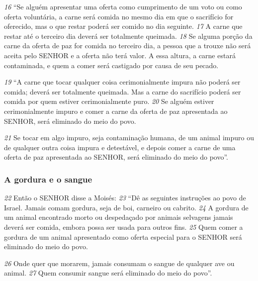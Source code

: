 \smallskip
\textit{\tiny 16}
“Se alguém apresentar uma oferta como cumprimento de um voto ou como
oferta voluntária, a carne será comida no mesmo dia em que o sacrifício for
oferecido, mas o que restar poderá ser comido no dia seguinte. 
\textit{\tiny 17}
A carne que
restar até o terceiro dia deverá ser totalmente queimada. 
\textit{\tiny 18}
Se alguma porção da
carne da oferta de paz for comida no terceiro dia, a pessoa que a trouxe não será
aceita pelo SENHOR e a oferta não terá valor. A essa altura, a carne estará
contaminada, e quem a comer será castigado por causa de seu pecado.
   
\smallskip
\textit{\tiny 19}
“A carne que tocar qualquer coisa cerimonialmente impura não poderá ser
comida; deverá ser totalmente queimada. Mas a carne do sacrifício poderá ser
comida por quem estiver cerimonialmente puro. 
\textit{\tiny 20}
Se alguém estiver
cerimonialmente impuro e comer a carne da oferta de paz apresentada ao SENHOR,
será eliminado do meio do povo. 

\smallskip
\textit{\tiny 21}
Se tocar em algo impuro, seja contaminação
humana, de um animal impuro ou de qualquer outra coisa impura e detestável, e
depois comer a carne de uma oferta de paz apresentada ao SENHOR, será
eliminado do meio do povo”.

\bigskip
\subsubsection*{A gordura e o sangue}  
\textit{\tiny 22}
Então o SENHOR disse a Moisés: 
\textit{\tiny 23}
“Dê as seguintes instruções ao povo de Israel.
Jamais comam gordura, seja de boi, carneiro ou cabrito. 
\textit{\tiny 24}
A gordura de um
animal encontrado morto ou despedaçado por animais selvagens jamais deverá
ser comida, embora possa ser usada para outros fins. 
\textit{\tiny 25}
Quem comer a gordura de
um animal apresentado como oferta especial para o SENHOR será eliminado do
meio do povo. 

\smallskip
\textit{\tiny 26}
Onde quer que morarem, jamais consumam o sangue de
qualquer ave ou animal. 
\textit{\tiny 27}
Quem consumir sangue será eliminado do meio do
povo”.

\bigskip

